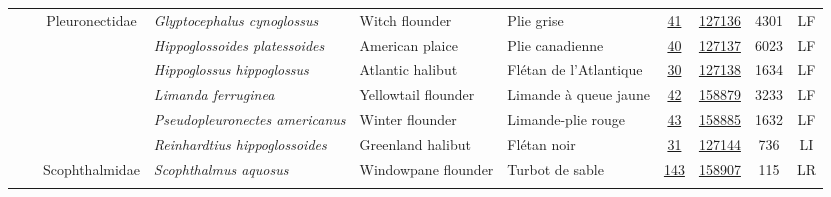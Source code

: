 \documentclass[12pt]{article}\usepackage[]{graphicx}\usepackage[]{color}
\begin{document}
\begin{landscapepage}
\begin{longtable}[t]{ccc>{\centering\arraybackslash}p{3cm}>{\centering\arraybackslash}p{3cm}>{\centering\arraybackslash}p{3cm}>{}c>{}ccc}
\hspace{1em}\hspace{1em} &  & Pleuronectidae & \em{Glyptocephalus cynoglossus} & Witch flounder & Plie grise & \href{#sec:603}{41} & \href{http://www.marinespecies.org/aphia.php?p=taxdetails&id=159258}{127136} & 4301 & LF\\
\hspace{1em}\hspace{1em} &  &  & \em{Hippoglossoides platessoides} & American plaice & Plie canadienne & \href{#sec:610}{40} & \href{http://www.marinespecies.org/aphia.php?p=taxdetails&id=151520}{127137} & 6023 & LF\\
\hspace{1em}\hspace{1em} &  &  & \em{Hippoglossus hippoglossus} & Atlantic halibut & Flétan de l'Atlantique & \href{#sec:619}{30} & \href{http://www.marinespecies.org/aphia.php?p=taxdetails&id=127117}{127138} & 1634 & LF\\
\hspace{1em}\hspace{1em} &  &  & \em{Limanda ferruginea} & Yellowtail flounder & Limande à queue jaune & \href{#sec:620}{42} & \href{http://www.marinespecies.org/aphia.php?p=taxdetails&id=127107}{158879} & 3233 & LF\\
\hspace{1em}\hspace{1em} &  &  & \em{Pseudopleuronectes americanus} & Winter flounder & Limande-plie rouge & \href{#sec:621}{43} & \href{http://www.marinespecies.org/aphia.php?p=taxdetails&id=126996}{158885} & 1632 & LF\\
\hspace{1em}\hspace{1em} &  &  & \em{Reinhardtius hippoglossoides} & Greenland halibut & Flétan noir & \href{#sec:622}{31} & \href{http://www.marinespecies.org/aphia.php?p=taxdetails&id=154675}{127144} & 736 & LI\\
\hspace{1em}\hspace{1em} &  & Scophthalmidae & \em{Scophthalmus aquosus} & Windowpane flounder & Turbot de sable & \href{#sec:623}{143} & \href{http://www.marinespecies.org/aphia.php?p=taxdetails&id=127072}{158907} & 115 & LR\\
\addlinespace[0.3em]
\\

\end{longtable}
\end{landscapepage}
\end{document}
